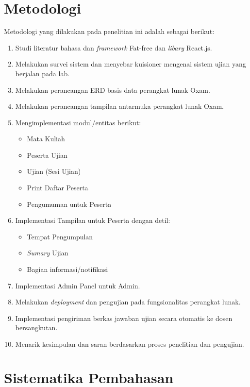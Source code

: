 \section{Metodologi}
Metodologi yang dilakukan pada penelitian ini adalah sebagai berikut:
\label{sec:metlit}
    \begin{enumerate}
        \item Studi literatur bahasa dan \textit{framework} Fat-free dan
            \textit{libary} React.js.
        \item Melakukan survei sistem dan menyebar kuisioner mengenai sistem ujian 
            yang berjalan pada lab.
		\item Melakukan perancangan ERD basis data perangkat lunak Oxam.
		\item Melakukan perancangan tampilan antarmuka perangkat lunak Oxam.
		\item Mengimplementasi modul/entitas berikut:
		    \begin{itemize}
		        \item Mata Kuliah
		        \item Peserta Ujian
		        \item Ujian (Sesi Ujian)
		        \item Print Daftar Peserta
		        \item Pengumuman untuk Peserta
		    \end{itemize}
	     \item Implementasi Tampilan untuk Peserta dengan detil:
		    \begin{itemize}
		        \item Tempat Pengumpulan
		        \item \textit{Sumary} Ujian
		        \item Bagian informasi/notifikasi
		    \end{itemize}
		\item Implementasi Admin Panel untuk Admin.
	    \item Melakukan \textit{deployment} dan pengujian pada fungsionalitas
	        perangkat lunak.
	    \item Implementasi pengiriman berkas jawaban ujian secara otomatis ke
	        dosen bersangkutan.
        \item Menarik kesimpulan dan saran berdasarkan proses penelitian dan
            pengujian.
    \end{enumerate}

\section{Sistematika Pembahasan}
\label{sec:sispem}

